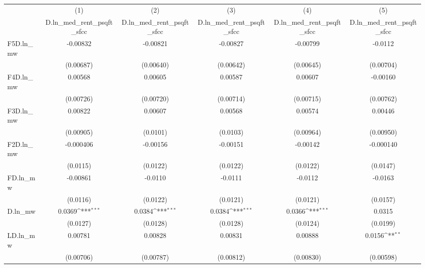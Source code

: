 {
\def\sym#1{\ifmmode^{#1}\else\(^{#1}\)\fi}
\begin{tabular}{l*{5}{c}}
\hline\hline
          &\multicolumn{1}{c}{(1)}&\multicolumn{1}{c}{(2)}&\multicolumn{1}{c}{(3)}&\multicolumn{1}{c}{(4)}&\multicolumn{1}{c}{(5)}\\
          &\multicolumn{1}{c}{D.ln\_med\_rent\_psqft\_sfcc}&\multicolumn{1}{c}{D.ln\_med\_rent\_psqft\_sfcc}&\multicolumn{1}{c}{D.ln\_med\_rent\_psqft\_sfcc}&\multicolumn{1}{c}{D.ln\_med\_rent\_psqft\_sfcc}&\multicolumn{1}{c}{D.ln\_med\_rent\_psqft\_sfcc}\\
\hline
F5D.ln\_mw & -0.00832         & -0.00821         & -0.00827         & -0.00799         &  -0.0112         \\
          &(0.00687)         &(0.00640)         &(0.00642)         &(0.00645)         &(0.00704)         \\
[1em]
F4D.ln\_mw &  0.00568         &  0.00605         &  0.00587         &  0.00607         & -0.00160         \\
          &(0.00726)         &(0.00720)         &(0.00714)         &(0.00715)         &(0.00762)         \\
[1em]
F3D.ln\_mw &  0.00822         &  0.00607         &  0.00568         &  0.00574         &  0.00446         \\
          &(0.00905)         & (0.0101)         & (0.0103)         &(0.00964)         &(0.00950)         \\
[1em]
F2D.ln\_mw &-0.000406         & -0.00156         & -0.00151         & -0.00142         &-0.000140         \\
          & (0.0115)         & (0.0122)         & (0.0122)         & (0.0122)         & (0.0147)         \\
[1em]
FD.ln\_mw  & -0.00861         &  -0.0110         &  -0.0111         &  -0.0112         &  -0.0163         \\
          & (0.0116)         & (0.0122)         & (0.0121)         & (0.0121)         & (0.0157)         \\
[1em]
D.ln\_mw   &   0.0369\sym{***}&   0.0384\sym{***}&   0.0384\sym{***}&   0.0366\sym{***}&   0.0315         \\
          & (0.0127)         & (0.0128)         & (0.0128)         & (0.0124)         & (0.0199)         \\
[1em]
LD.ln\_mw  &  0.00781         &  0.00828         &  0.00831         &  0.00888         &   0.0156\sym{**} \\
          &(0.00706)         &(0.00787)         &(0.00812)         &(0.00830)         &(0.00598)         \\

\end{tabular}}
